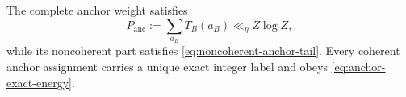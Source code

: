 \begin{proposition}
\label{prop:anchor-partition}
The complete anchor weight satisfies
\begin{equation}
\label{eq:anchor-weight-total}
 P_{\mathrm{anc}}:=\sum_{a_B}T_B(a_B)\ll_\eta Z\log Z,
\end{equation}
while its noncoherent part satisfies \cref{eq:noncoherent-anchor-tail}. Every coherent anchor assignment carries a unique exact integer label and obeys \cref{eq:anchor-exact-energy}.
\end{proposition}
